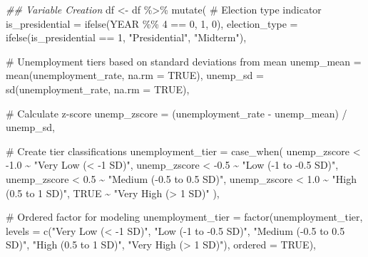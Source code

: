 \documentclass[
  11pt,
]{article}
\newenvironment{Shaded}{\begin{snugshade}}{\end{snugshade}}
\newcommand{\AttributeTok}[1]{\textcolor[rgb]{0.40,0.45,0.13}{#1}}
\newcommand{\CommentTok}[1]{\textcolor[rgb]{0.37,0.37,0.37}{#1}}
\newcommand{\ConstantTok}[1]{\textcolor[rgb]{0.56,0.35,0.01}{#1}}
\newcommand{\DecValTok}[1]{\textcolor[rgb]{0.68,0.00,0.00}{#1}}
\newcommand{\DocumentationTok}[1]{\textcolor[rgb]{0.37,0.37,0.37}{\textit{#1}}}
\newcommand{\FloatTok}[1]{\textcolor[rgb]{0.68,0.00,0.00}{#1}}
\newcommand{\FunctionTok}[1]{\textcolor[rgb]{0.28,0.35,0.67}{#1}}
\newcommand{\NormalTok}[1]{\textcolor[rgb]{0.00,0.23,0.31}{#1}}
\newcommand{\OtherTok}[1]{\textcolor[rgb]{0.00,0.23,0.31}{#1}}
\newcommand{\SpecialCharTok}[1]{\textcolor[rgb]{0.37,0.37,0.37}{#1}}
\newcommand{\StringTok}[1]{\textcolor[rgb]{0.13,0.47,0.30}{#1}}
\begin{document}
\begin{Shaded}
\begin{Highlighting}[]
\DocumentationTok{\#\# Variable Creation}
\NormalTok{df }\OtherTok{\textless{}{-}}\NormalTok{ df }\SpecialCharTok{\%\textgreater{}\%}
  \FunctionTok{mutate}\NormalTok{(}
    \CommentTok{\# Election type indicator}
    \AttributeTok{is\_presidential =} \FunctionTok{ifelse}\NormalTok{(YEAR }\SpecialCharTok{\%\%} \DecValTok{4} \SpecialCharTok{==} \DecValTok{0}\NormalTok{, }\DecValTok{1}\NormalTok{, }\DecValTok{0}\NormalTok{),}
    \AttributeTok{election\_type =} \FunctionTok{ifelse}\NormalTok{(is\_presidential }\SpecialCharTok{==} \DecValTok{1}\NormalTok{, }\StringTok{"Presidential"}\NormalTok{, }\StringTok{"Midterm"}\NormalTok{),}
    
    \CommentTok{\# Unemployment tiers based on standard deviations from mean}
    \AttributeTok{unemp\_mean =} \FunctionTok{mean}\NormalTok{(unemployment\_rate, }\AttributeTok{na.rm =} \ConstantTok{TRUE}\NormalTok{),}
    \AttributeTok{unemp\_sd =} \FunctionTok{sd}\NormalTok{(unemployment\_rate, }\AttributeTok{na.rm =} \ConstantTok{TRUE}\NormalTok{),}
    
    \CommentTok{\# Calculate z{-}score}
    \AttributeTok{unemp\_zscore =}\NormalTok{ (unemployment\_rate }\SpecialCharTok{{-}}\NormalTok{ unemp\_mean) }\SpecialCharTok{/}\NormalTok{ unemp\_sd,}
    
    \CommentTok{\# Create tier classifications}
    \AttributeTok{unemployment\_tier =} \FunctionTok{case\_when}\NormalTok{(}
\NormalTok{      unemp\_zscore }\SpecialCharTok{\textless{}} \SpecialCharTok{{-}}\FloatTok{1.0} \SpecialCharTok{\textasciitilde{}} \StringTok{"Very Low (\textless{} {-}1 SD)"}\NormalTok{,}
\NormalTok{      unemp\_zscore }\SpecialCharTok{\textless{}} \SpecialCharTok{{-}}\FloatTok{0.5} \SpecialCharTok{\textasciitilde{}} \StringTok{"Low ({-}1 to {-}0.5 SD)"}\NormalTok{,}
\NormalTok{      unemp\_zscore }\SpecialCharTok{\textless{}} \FloatTok{0.5}  \SpecialCharTok{\textasciitilde{}} \StringTok{"Medium ({-}0.5 to 0.5 SD)"}\NormalTok{,}
\NormalTok{      unemp\_zscore }\SpecialCharTok{\textless{}} \FloatTok{1.0}  \SpecialCharTok{\textasciitilde{}} \StringTok{"High (0.5 to 1 SD)"}\NormalTok{,}
      \ConstantTok{TRUE}                \SpecialCharTok{\textasciitilde{}} \StringTok{"Very High (\textgreater{} 1 SD)"}
\NormalTok{    ),}
    
    \CommentTok{\# Ordered factor for modeling}
    \AttributeTok{unemployment\_tier =} \FunctionTok{factor}\NormalTok{(unemployment\_tier, }
                              \AttributeTok{levels =} \FunctionTok{c}\NormalTok{(}\StringTok{"Very Low (\textless{} {-}1 SD)"}\NormalTok{, }
                                        \StringTok{"Low ({-}1 to {-}0.5 SD)"}\NormalTok{,}
                                        \StringTok{"Medium ({-}0.5 to 0.5 SD)"}\NormalTok{,}
                                        \StringTok{"High (0.5 to 1 SD)"}\NormalTok{,}
                                        \StringTok{"Very High (\textgreater{} 1 SD)"}\NormalTok{),}
                              \AttributeTok{ordered =} \ConstantTok{TRUE}\NormalTok{),}
    

\end{Highlighting}
\end{Shaded}
\end{document}
